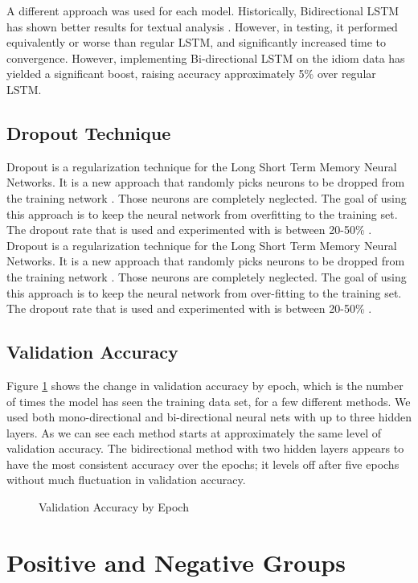 \documentclass[titlepage,letterpaper]{article}
\begin{document}
A different approach was used for each model. Historically, Bidirectional LSTM has shown better results for textual analysis \cite{Keras.io}. However, in testing, it performed equivalently or worse than regular LSTM, and significantly increased time to convergence. However, implementing Bi-directional LSTM on the idiom data has yielded a significant boost, raising accuracy approximately 5\% over regular LSTM.

\subsection{Dropout Technique}
Dropout is a regularization technique for the Long Short Term Memory Neural Networks. It is a new approach that randomly picks neurons to be dropped from the training network \cite{NeuralNet}. Those neurons are completely neglected. The goal of using this approach is to keep the neural network from overfitting to the training set. The dropout rate that is used and experimented with is between 20-50\% \cite{NeuralNet}.
Dropout is a regularization technique for the Long Short Term Memory Neural Networks. It is a new approach that randomly picks neurons to be dropped from the training network \cite{NeuralNet}. Those neurons are completely neglected. The goal of using this approach is to keep the neural network from over-fitting to the training set. The dropout rate that is used and experimented with is between 20-50\% \cite{NeuralNet}.

\subsection{Validation Accuracy}
Figure \ref{valepoch} shows the change in validation accuracy by epoch, which is the number of times the model has seen the training data set, for a few different methods. We used both mono-directional and bi-directional neural nets with up to three hidden layers. As we can see each method starts at approximately the same level of validation accuracy. The bidirectional method with two hidden layers appears to have the most consistent accuracy over the epochs; it levels off after five epochs without much fluctuation in validation accuracy. 

\begin{figure}[htb]
	\centering
	\resizebox{4in}{!}{}
	\caption{Validation Accuracy by Epoch}\label{valepoch}
\end{figure}
\section{Positive and Negative Groups}
\end{document}
